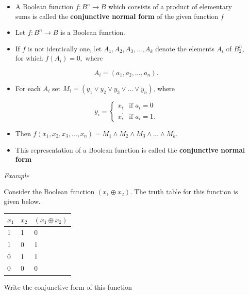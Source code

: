 \documentclass[]{book}
\providecommand{\tightlist}{%
  \setlength{\itemsep}{0pt}\setlength{\parskip}{0pt}}
\begin{document}
\begin{itemize}
\tightlist
\item
  A Boolean function \(f: B^n \rightarrow B\) which consists of a product of elementary sums is called the \textbf{conjunctive normal form} of the given function \(f\)
\item
  Let \(f: B^n \rightarrow B\) is a Boolean function.
\item
  If \(f\) is not identically one, let \(A_1, A_2, A_3, \dots, A_k\) denote the elements \(A_i\) of \(B_2^n,\) for which \(f(A_i) =0,\) where
\end{itemize}

\[A_i = (a_1, a_2,\dots, a_n).\]

\begin{itemize}
\tightlist
\item
  For each \(A_i\) set \(M_i = (y_1 \lor y_2 \lor y_3\lor \dots \lor y_n)\), where
\end{itemize}

\begin{equation}
y_i =
\begin{cases} 
x_i & \text{if } a_i=0\\
x_i^\prime & \text{if } a_i=1.
\end{cases}
\end{equation}

\begin{itemize}
\tightlist
\item
  Then \(f(x_1, x_2, x_3, \dots, x_n)= M_1 \land M_2 \land M_3 \land \dots \land M_k.\)
\item
  This representation of a Boolean function is called the \textbf{conjunctive normal form}
\end{itemize}

\emph{Example}

Consider the Boolean function \((x_1 \oplus x_2).\) The truth table for this function is given below.

\begin{longtable}[]{@{}lll@{}}
\toprule
\(x_1\) & \(x_2\) & \((x_1 \oplus x_2)\)\tabularnewline
\midrule
\endhead
1 & 1 & 0\tabularnewline
1 & 0 & 1\tabularnewline
0 & 1 & 1\tabularnewline
0 & 0 & 0\tabularnewline
\bottomrule
\end{longtable}

Write the conjunctive form of this function
\end{document}
